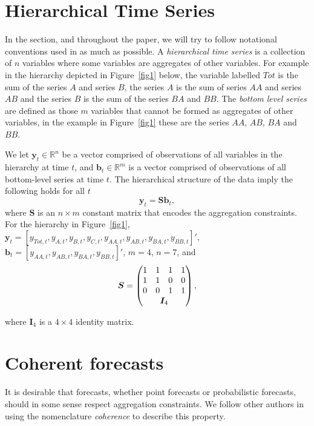\documentclass[a4paper, 11pt]{article}
\theoremstyle{theo}
\theoremstyle{definition}
\begin{document}
\section{Hierarchical Time Series}\label{sec:notation}

In the section, and throughout the paper, we will try to follow notational conventions used in \citet{Wickramasuriya2017} as much as possible.  A {\em hierarchical time series} is a collection of $n$ variables where some variables are aggregates of other variables.  For example in the hierarchy depicted in Figure~\ref{fig1} below, the variable labelled $Tot$ is the sum of the series $A$
and series $B$, the series $A$ is the sum of series $AA$ and series $AB$ and the series $B$ is the sum of the series $BA$ and $BB$.  The {\em bottom level series} are defined as those $m$ variables that cannot be formed as aggregates of other variables, in the example in Figure~\ref{fig1} these are the series $AA$, $AB$, $BA$ and $BB$. 

We let $\bm{y}_t \in \mathbb{R}^n$ be a vector comprised of observations of all variables in the hierarchy at time $t$,  and $\bm{b}_t \in \mathbb{R}^m$ is a vector comprised of observations of all bottom-level series at time $t$. The hierarchical structure of the data imply the following holds for all $t$
\begin{equation}
  \bm{y}_t = \bm{Sb}_t,
\end{equation}
where $\bm{S}$ is an $n \times m$ constant matrix that encodes the aggregation constraints.  For the hierarchy in Figure~\ref{fig1}, $\bm{y}_t = [y_{Tot,t},y_{A,t}, y_{B,t},y_{C,t},y_{AA,t}, y_{AB,t}, y_{BA,t}, y_{BB,t}]'$, $\bm{b}_t = [y_{AA,t}, y_{AB,t}, y_{BA,t}, y_{BB,t}]'$, $m=4$, $n=7$, and 
$$ 
  \bm{S} = \begin{pmatrix} 
               1& 1 &1 &1  \\ 
               1 &1 & 0 &0 \\   
               0&0  & 1 & 1 \\ 
               & \multicolumn{2}{c}{\bm{I}_4} &   
           \end{pmatrix}, 
$$ 

where $\bm{I}_4$ is a $4\times 4$ identity matrix.  

\section{Coherent forecasts}\label{sec:definitions}

It is desirable that forecasts, whether point forecasts or probabilistic forecasts, should in some sense respect aggregation constraints.  We follow other authors \cite{Wickramasuriya2017} in using the nomenclature {\em coherence} to describe this property.   
\end{document}
